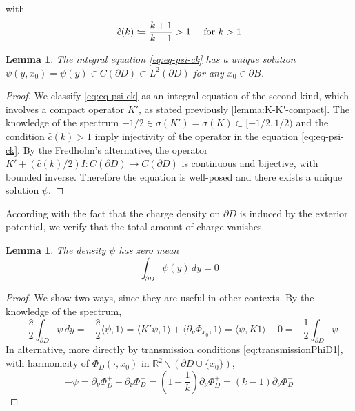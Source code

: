 \documentclass[10pt, a4paper, twoside, openright]{book}
\theoremstyle{definition}
\theoremstyle{plain}
\theoremstyle{plain}
\theoremstyle{plain}
\theoremstyle{plain}
\theoremstyle{plain}
\newtheorem{lemma}[subsection]{Lemma}
\theoremstyle{plain}
\theoremstyle{plain}
\theoremstyle{plain}
\begin{document}
with 
\begin{equation}
 \hat{c}(k)\coloneqq\dfrac{k+1}{k-1} > 1 \quad \textup{ for } k>1
\end{equation}
\begin{lemma}
 The integral equation \eqref{eq:eq-psi-ck} has a unique solution $\psi(y,x_0)=\psi(y) \in C(\partial D) \subset L^2(\partial D)$ for any $x_0 \in \partial B$.
\end{lemma}
\begin{proof}
 We classify \eqref{eq:eq-psi-ck} as an integral equation of the second kind, which involves a compact operator $K'$, as stated previously \ref{lemma:K-K'-compact}. The knowledge of the spectrum $-1/2 \in \sigma(K')=\sigma(K) \subset [-1/2,1/2)$ and the condition $\hat{c}(k)>1$ imply injectivity of the operator in the equation \eqref{eq:eq-psi-ck}. 
 By the Fredholm's alternative, the operator $K'+(\hat{c}(k)/2)I:C(\partial D)\to C(\partial D)$ is continuous and bijective, with bounded inverse.
 Therefore the equation is well-posed and there exists a unique solution $\psi$.
\end{proof}
According with the fact that the charge density on $\partial D$ is induced by the exterior potential, we verify that the total amount of charge vanishes.
\begin{lemma}
 The density $\psi$ has zero mean
 \begin{equation}
  \int_{\partial D} \psi(y)\, dy = 0
 \end{equation}
\end{lemma}
\begin{proof}
We show two ways, since they are useful in other contexts. By the knowledge of the spectrum,
 \begin{equation*}
  -\frac{\hat{c}}{2} \int_{\partial D} \psi\,dy = -\frac{\hat{c}}{2} \langle \psi,1\rangle = \langle K'\psi,1\rangle + \langle \partial_\nu\Phi_{x_0},1\rangle = \langle \psi,K 1\rangle + 0 = -\frac{1}{2}\int_{\partial D} \psi
 \end{equation*}
 In alternative, more directly by transmission conditions \eqref{eq:transmissionPhiD1}, with harmonicity of $\Phi_D(\cdot,x_0)$ in $\mathbb{R}^2\backslash(\partial D\cup\{x_0\})$,
 \begin{equation*}
  -\psi=\partial_\nu \Phi_D^+-\partial_\nu \Phi_D^-=(1-\frac{1}{k})\partial_\nu \Phi_D^+ = (k-1)\partial_\nu \Phi_D^-
 \end{equation*} 
\end{proof}
\end{document}
